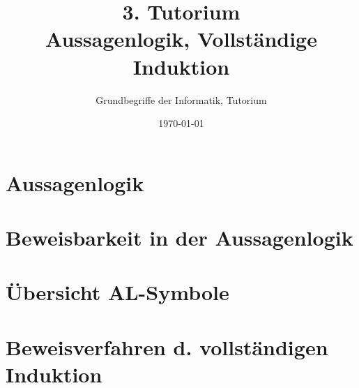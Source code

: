 




\title[Aussagenlogik, Vollständige Induktion]{3. Tutorium\\ Aussagenlogik, Vollständige Induktion}
\subtitle{Grundbegriffe der Informatik, Tutorium \hashtag\mytutnumber}
\date{\today}
\usepackage{tikz}


\titleframe




\roadmap

\section{Aussagenlogik}



\section{Beweisbarkeit in der Aussagenlogik}



\section{Übersicht AL-Symbole}


\section[Vollständige Induktion]{Beweisverfahren d. vollständigen Induktion}







